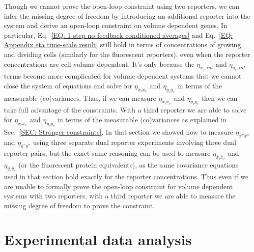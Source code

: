 \documentclass[%
 reprint,prx,
superscriptaddress,
%
%
%
%
%
%
%
%
%
 amsmath,amssymb,
 aps,
%
%
%
%
%
%
]{revtex4-2}
\begin{document}
{{Though we cannot prove the open-loop constraint using two reporters, we can infer the missing degree of freedom by introducing an additional reporter into the system and derive an open-loop constraint on volume dependent genes. In particular, Eq.~\eqref{EQ: 1-step no-feedback conditioned averages} and Eq.~\eqref{EQ: Appendix eta time-scale result} still hold in terms of concentrations of growing and dividing cells (similarly for the fluorescent reporters), even when the reporter concentrations are cell volume dependent. It's only because the $\eta_{x_{c},int}$ and $\eta_{y_{c},int}$ terms become more complicated for volume dependent systems that we cannot close the system of equations and solve for $\eta_{\bar{x}_{c}\bar{x}_{c}}$ and $\eta_{\bar{y}_{c}\bar{y}_{c}}$ in terms of the measurable (co)variances. Thus, if we can measure $\eta_{\bar{x}_{c}\bar{x}_{c}}$ and $\eta_{\bar{y}_{c}\bar{y}_{c}}$ then we can take full advantage of the constraints. With a third reporter we are able to solve for $\eta_{\bar{x}_{c}\bar{x}_{c}}$ and $\eta_{\bar{y}_{c}\bar{y}_{c}}$ in terms of the measurable (co)variances as explained in Sec.~\ref{SEC: Stronger constraints}. In that section we showed how to measure $\eta_{\bar{x}''\bar{x}''}$ and $\eta_{\bar{y}''\bar{y''}}$ using three separate dual reporter experiments involving three dual reporter pairs, but the exact same reasoning can be used to measure $\eta_{\bar{x}_{c}\bar{x}_{c}}$ and $\eta_{\bar{y}_{c}\bar{y}_{c}}$ (or the fluorescent protein equivalents), as the same covariance equations used in that section hold exactly for the reporter concentrations. Thus even if we are unable to formally prove the open-loop constraint for volume dependent systems with two reporters, with a third reporter we are able to measure the missing degree of freedom to prove the constraint.  















\section{Experimental data analysis}
\label{SEC: Appendix Experimental data analysis}

}}
\end{document}
